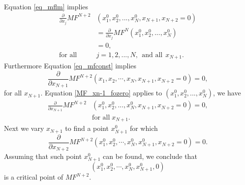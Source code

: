 Equation \ref{eq_mflm} implies
\begin{equation}
\begin{split}
\frac{\partial}{\partial{x_j}}MF^{N+2}&(x^{0}_1, x^{0}_{2},...,x^{0}_{N},x_{N+1},x_{N+2}=0) \\
&= \frac{\partial}{\partial{x_j}}MF^{N}(x^{0}_1, x^{0}_{2},...,x^{0}_{N}) \\
&= 0, \\
\text{for all} \: &j = 1, 2, ..., N, \:\: \text{and all} \:\: x_{N+1}.
\end{split}
\end{equation}Furthermore Equation \ref{eq_mfconst} implies 
\begin{equation}\label{MF_xn-1_fozero}
\frac{\partial}{\partial{x_{N+1}}}MF^{N+2}(x_1, x_{2},\cdots,x_{N}, x_{N+1},x_{N+2}=0) = 0,
\end{equation}%
for all $x_{N+1}$. 
Equation \ref{MF_xn-1_fozero} applies to $(x^{0}_1, x^{0}_{2},...,x^{0}_{N})$, we have
\begin{equation}
\begin{split}
\frac{\partial}{\partial{x_{N+1}}}MF^{N+2}&(x^0_1, x^0_{2},...,x^0_{N}, x_{N+1},x_{N+2}=0) = 0,\\
&\text{for all}\; x_{N+1}.
\end{split}
\end{equation}Next we vary $x_{N+1}$ to find a point $x^0_{N+1}$ for which 
\begin{equation}\label{eq:1dsearch}
\frac{\partial}{\partial{x_{N+2}}}MF^{N+2}(x^0_1, x^0_{2}, \cdots,x^0_{N}, x^0_{N+1},x_{N+2}=0) = 0.
\end{equation}Assuming that such point $x^0_{N+1}$ can be found, we conclude that
\begin{equation*}
(x^0_1, x^0_{2},\cdots,x^0_{N}, x^0_{N+1},0)
\end{equation*}
\noindent is a critical point of $MF^{N+2}$. 
 
